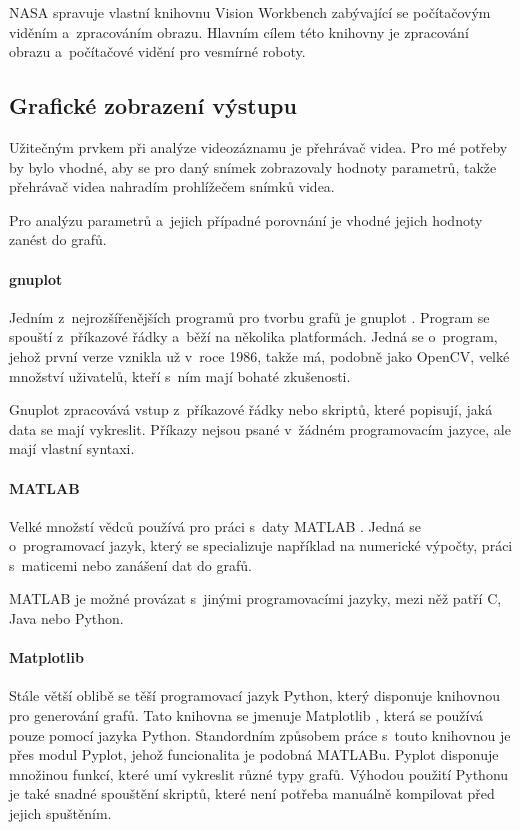 NASA spravuje vlastní knihovnu Vision Workbench zabývající se počítačovým viděním a~zpracováním obrazu. Hlavním cílem této knihovny je zpracování obrazu a~počítačové vidění pro vesmírné roboty.

\subsection{Grafické zobrazení výstupu}

Užitečným prvkem při analýze videozáznamu je přehrávač videa. Pro mé potřeby by bylo vhodné, aby se pro daný snímek zobrazovaly hodnoty parametrů, takže přehrávač videa nahradím prohlížečem snímků videa.

Pro analýzu parametrů a~jejich případné porovnání je vhodné jejich hodnoty zanést do grafů.

\paragraph{gnuplot}

Jedním z~nejrozšířenějších programů pro tvorbu grafů je gnuplot \citep{gnuplot}. Program se spouští z~příkazové řádky a~běží na několika platformách. Jedná se o~program, jehož první verze vznikla už v~roce 1986, takže má, podobně jako OpenCV, velké množství uživatelů, kteří s~ním mají bohaté zkušenosti.

Gnuplot zpracovává vstup z~příkazové řádky nebo skriptů, které popisují, jaká data se mají vykreslit. Příkazy nejsou psané v~žádném programovacím jazyce, ale mají vlastní syntaxi.

\paragraph{MATLAB}

Velké množstí vědců používá pro práci s~daty MATLAB \citep{MATLAB}. Jedná se o~programovací jazyk, který se specializuje například na numerické výpočty, práci s~maticemi nebo zanášení dat do grafů.

MATLAB je možné provázat s~jinými programovacími jazyky, mezi něž patří C, Java nebo Python.

\paragraph{Matplotlib}

Stále větší oblibě se těší programovací jazyk Python, který disponuje knihovnou pro generování grafů. Tato knihovna se jmenuje Matplotlib \citep{Matplotlib}, která se používá pouze pomocí jazyka Python. Standordním způsobem práce s~touto knihovnou je přes modul Pyplot, jehož funcionalita je podobná MATLABu. Pyplot disponuje množinou funkcí, které umí vykreslit různé typy grafů. Výhodou použití Pythonu je také snadné spouštění skriptů, které není potřeba manuálně kompilovat před jejich spuštěním.

